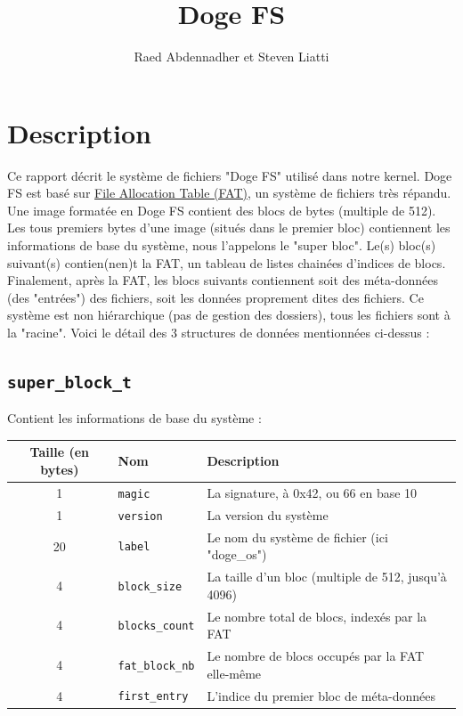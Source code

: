 \documentclass[a4paper, 12pt]{article}
\begin{document}
\title{Doge FS}
\author{Raed Abdennadher et Steven Liatti}
\maketitle


\section{Description}
Ce rapport décrit le système de fichiers "Doge FS" utilisé dans notre kernel. Doge FS est basé sur
\href{https://en.wikipedia.org/wiki/File_Allocation_Table}{File Allocation Table (FAT)}, un système
de fichiers très répandu. Une image formatée en Doge FS contient des blocs de bytes (multiple de 512).
Les tous premiers bytes d'une image (situés dans le premier bloc) contiennent les informations de base
du système, nous l'appelons le "super bloc". Le(s) bloc(s) suivant(s) contien(nen)t la FAT, un tableau de
listes chainées d'indices de blocs. Finalement, après la FAT, les blocs suivants contiennent soit des
méta-données (des "entrées") des fichiers, soit les données proprement dites des fichiers. Ce système
est non hiérarchique (pas de gestion des dossiers), tous les fichiers sont à la "racine".
Voici le détail des 3 structures de données mentionnées ci-dessus :

\subsection{\texttt{super_block_t}} Contient les informations de base du système :

\begin{tabular}{|c|l|p{.5\linewidth}|}	\hline
	\textbf{Taille (en bytes)}	& \textbf{Nom} & \textbf{Description} \\ \hline
	1	& \texttt{magic}			& La signature, à 0x42, ou 66 en base 10 				\\ \hline
	1	& \texttt{version}		& La version du système 								\\ \hline
	20	& \texttt{label}			& Le nom du système de fichier (ici "doge\_os")			\\ \hline
	4	& \texttt{block_size}	& La taille d'un bloc (multiple de 512, jusqu'à 4096) 	\\ \hline
	4	& \texttt{blocks_count}		& Le nombre total de blocs, indexés par la FAT 			\\ \hline
	4	& \texttt{fat_block_nb}	& Le nombre de blocs occupés par la FAT elle-même 		\\ \hline
	4	& \texttt{first_entry}	& L'indice du premier bloc de méta-données				\\ \hline
\end{tabular}
\end{document}
